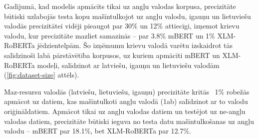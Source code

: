 Gadījumā, kad modelis apmācīts tikai uz angļu valodas korpusa, precizitāte būtiski uzlabojās testa kopu mašīntulkojot uz angļu valodu, igauņu un lietuviešu valodās precizitātei vidēji pieaugot par 30\% un 12\% attiecīgi, izņemot krievu valodu, kur precizitāte mazliet samazinās -- par 3.8\% mBERT un 1\% XLM-RoBERTa jēdzientelpām. Šo izņēmumu krievu valodā varētu izskaidrot tās salīdzinoši labā pārstāvētība korpusos, uz kuriem apmācīti mBERT un XLM-RoBERTa modeļi, salīdzinot ar latviešu, igauņu un lietuviešu valodām (\ref{fig:dataset-size} attēls).



Maz-resursu valodās (latviešu, lietuviešu, igauņu) precizitāte kritās ~1\% robežās apmācot uz datiem, kas mašīntulkoti angļu valodā (1ab) salīdzinot ar to valodu oriģināldatiem. Apmācot tikai uz angļu valodas datiem un testējot uz ne-angļu valodas datiem, precizitāte būtiski ieguva no testa datu mašīntulkošanas uz angļu valodu -- mBERT par
18.1\%, bet XLM-RoBERTa par
12.7\%.



